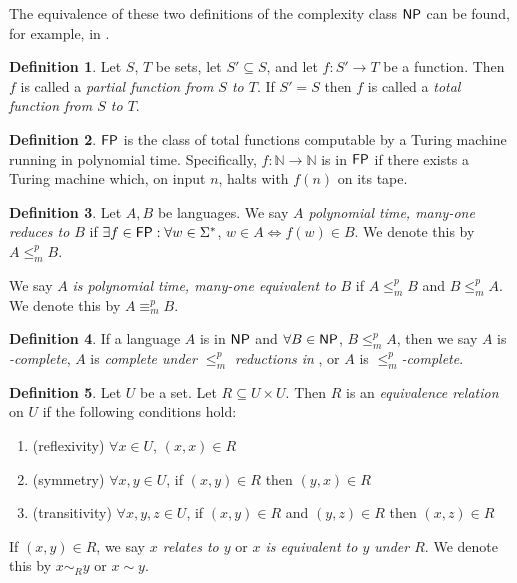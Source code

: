 \documentclass{article}
\theoremstyle{definition} \newtheorem{definition}[definition]{Definition}
\newcommand{\sigmastar}{\Sigma^{*}} %
\newcommand{\mor}{\leq^{p}_{m}} %
\newcommand{\moequiv}{\equiv^{p}_m} %
\newcommand{\defn}[1]{\emph{#1}} %
\begin{document}
The equivalence of these two definitions of the complexity class ${\mathsf{NP}}$ can be
found, for example, in \cite{sipser06}.

\begin{definition}
  Let $S$, $T$ be sets, let $S'\subseteq S$, and let $f:S'\to T$ be a
  function. Then $f$ is called a \defn{partial function from $S$ to $T$}. If
  $S'=S$ then $f$ is called a \defn{total function from $S$ to $T$}.
\end{definition}

\begin{definition}
  ${\mathsf{FP}}$ is the class of total functions computable by a Turing machine running
  in polynomial time. Specifically, $f\colon\mathbb{N}\to\mathbb{N}$ is in
  ${\mathsf{FP}}$ if there exists a Turing machine which, on input $n$, halts with $f(n)$
  on its tape.
\end{definition}

\begin{definition}
  Let $A,B$ be languages. We say \defn{$A$ polynomial time, many-one reduces to
    $B$} if $\exists f\in\FP:\forall w\in\sigmastar$, $w\in A\iff f(w)\in
    B$. We denote this by $A\mor B$.
  
  We say $A$ \defn{is polynomial time, many-one equivalent to} $B$ if $A\mor
  B$ and $B\mor A$. We denote this by $A\moequiv B$.
\end{definition}

\begin{definition}
  If a language $A$ is in ${\mathsf{NP}}$ and $\forall B\in{\ensuremath{\mathsf{NP}}}$, $B\mor A$, then we say
  $A$ is \defn{\NP-complete}, $A$ is \defn{complete under $\mor$ reductions in
    \NP}, or $A$ is \defn{$\mor$-complete}.
\end{definition}

\begin{definition}
  Let $U$ be a set. Let $R\subseteq U\times U$. Then $R$ is an
    \defn{equivalence relation} on $U$ if the following conditions hold:
    \renewcommand{\labelenumi}{\roman{enumi}.}
  \begin{enumerate}
  \item (reflexivity) $\forall x\in U$, $(x, x)\in R$
  \item (symmetry) $\forall x,y\in U$, if $(x,y)\in R$ then $(y,x)\in
    R$
  \item (transitivity) $\forall x,y,z\in U$, if $(x,y)\in R$ and $(y,z)\in R$
    then $(x,z)\in R$
  \end{enumerate}
  If $(x,y)\in R$, we say \defn{$x$ relates to $y$} or \defn{$x$ is equivalent
    to $y$ under $R$}. We denote this by $x\sim_R y$ or $x\sim y$.
\end{definition}
\end{document}
